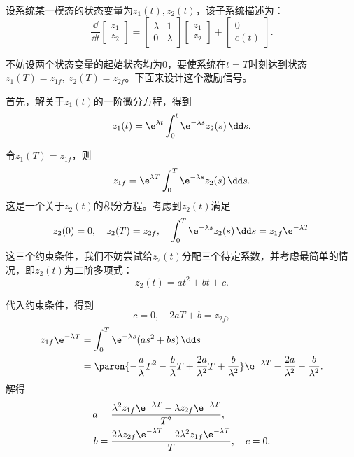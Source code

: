 \begin{example}
    设系统某一模态的状态变量为$z_1(t),z_2(t)$，该子系统描述为：
    \begin{equation}
        \frac{\dd}{\dd t}\begin{bmatrix}
        z_1\\
        z_2
        \end{bmatrix}=\begin{bmatrix}
        \lambda & 1\\
        0 & \lambda
        \end{bmatrix}\begin{bmatrix}
        z_1\\
        z_2
        \end{bmatrix}+\begin{bmatrix}
        0\\
        e(t)
        \end{bmatrix}.
    \end{equation}

    不妨设两个状态变量的起始状态均为$0$，要使系统在$t=T$时刻达到状态$z_1(T)=z_{1f},\ z_2(T)=z_{2f}$。下面来设计这个激励信号。

    首先，解关于$z_1(t)$的一阶微分方程，得到
    \begin{equation}
        z_1(t)=\e^{\lambda t}\int_0^t \e^{-\lambda s}z_2(s)\,\dd s.
    \end{equation}

    令$z_1(T)=z_{1f}$，则
    \begin{equation}
        z_{1f}=\e^{\lambda T}\int_0^T \e^{-\lambda s}z_2(s)\,\dd s.
    \end{equation}
    这是一个关于$z_2(t)$的积分方程。考虑到$z_2(t)$满足
    \begin{equation}
        z_2(0)=0,\quad z_2(T)=z_{2f},\quad \int_{0}^T \e^{-\lambda s}z_2(s)\,\dd s=z_{1f}\e^{-\lambda T}
    \end{equation}
    这三个约束条件，我们不妨尝试给$z_2(t)$分配三个待定系数，并考虑最简单的情况，即$z_2(t)$为二阶多项式：
    \begin{equation}
        z_2(t)=at^2+bt+c.
    \end{equation}

    代入约束条件，得到
    \begin{equation}
        c=0,\quad 2aT+b=z_{2f},
    \end{equation}
    \begin{align}
        z_{1f}\e^{-\lambda T}&=\int_0^T \e^{-\lambda s}(as^2+bs)\,\dd s\nonumber\\
        &=\paren{-\frac{a}{\lambda}T^2-\frac{b}{\lambda}T+\frac{2a}{\lambda^2}T+\frac{b}{\lambda^2}}\e^{-\lambda T}-\frac{2a}{\lambda^2}-\frac{b}{\lambda^2}.
    \end{align}
    解得
    \begin{align}
        a&=\frac{\lambda^2 z_{1f}\e^{-\lambda T}-\lambda z_{2f}\e^{-\lambda T}}{T^2},\nonumber\\
        b&=\frac{2\lambda z_{2f}\e^{-\lambda T}-2\lambda^2 z_{1f}\e^{-\lambda T}}{T},\quad c=0.
    \end{align}


\end{example}
